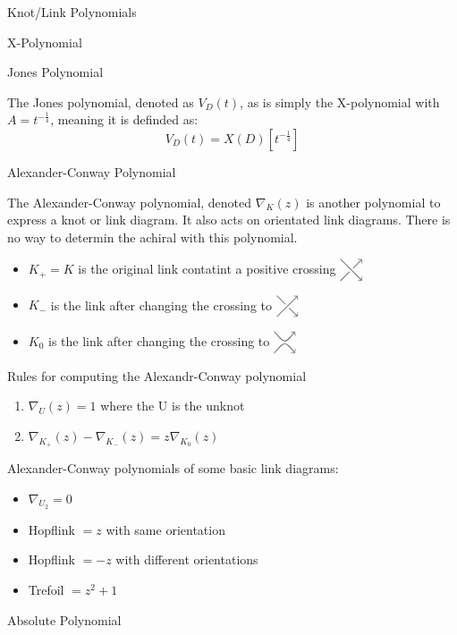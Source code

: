 \documentclass[12pt, letterpaper]{article}
\newcommand{\KP}[1]{%
  \begin{tikzpicture}[baseline=-\dimexpr\fontdimen22\textfont2\relax]
  #1
  \end{tikzpicture}%
}
\newcommand{\DPCross}{%
  \KP{
    \draw[color=gray,thick,->] (-0.3,0.3) -- (0.3,-0.3);
    \draw[color=gray,thick] (-0.3,-0.3) -- (-0.05,-0.05);
    \draw[color=gray,thick,->] (0.05,0.05) -- (0.3,0.3);
  }%
}
\newcommand{\DNCross}{%
  \KP{
    \draw[color=gray,thick] (-0.3,0.3) -- (-0.05,0.05);
    \draw[color=gray,thick,->] (0.05,-0.05) -- (0.3,-0.3);
    \draw[color=gray,thick,->] (-0.3,-0.3) -- (0.3,0.3);
  }%
}
\newcommand{\DSmooth}{%
  \KP{%
    \draw[color=gray,thick,->] (-0.3,0.3)..controls (0,-0.05).. (0.3,0.3);
    \draw[color=gray,thick,->] (-0.3,-0.3)..controls (0,0.05).. (0.3,-0.3);
  }%
}
\begin{document}
\begin{section}{Knot/Link Polynomials}
\begin{subsection}{X-Polynomial}
  \end{subsection}

  \begin{subsection}{Jones Polynomial}

    The Jones polynomial, denoted as \(V_{D}(t)\), as is simply the X-polynomial
    with \(A = t^{-\frac{1}{4}}\), meaning it is definded as:
    \[V_{D}(t) = X(D)[t^{-\frac{1}{4}}]\]

  \end{subsection}

  \begin{subsection}{Alexander-Conway Polynomial}

    The Alexander-Conway polynomial, denoted \(\nabla_{K}(z)\)
    is another polynomial to express a knot or link diagram. It also acts on
    orientated link diagrams.
    There is no way to determin the achiral with this polynomial.

    \begin{itemize}
      \item \(K_{+} = K\) is the original link contatint a positive crossing
            \(\DPCross\)
      \item \(K_{-}\) is the link after changing the crossing to \(\DNCross\)
      \item \(K_{0}\) is the link after changing the crossing to \(\DSmooth\)
    \end{itemize}

    Rules for computing the Alexandr-Conway polynomial
    \begin{enumerate}
      \item \(\nabla_{U}(z) = 1\) where the U is the unknot
      \item \(\nabla_{K_{+}}(z) - \nabla_{K_{-}}(z) = z\nabla_{K_{0}}(z)\)
    \end{enumerate}

    Alexander-Conway polynomials of some basic link diagrams:
    \begin{itemize}
      \item \(\nabla_{U_{2}} = 0\)
      \item Hopflink \(= z\) with same orientation
      \item Hopflink \(= -z\) with different orientations
      \item Trefoil \(= z^{2} + 1\)
    \end{itemize}

  \end{subsection}

  \begin{subsection}{Absolute Polynomial}


\end{subsection}
\end{section}
\end{document}
